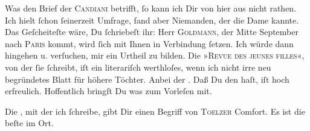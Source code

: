 \pstart
           Was den Brief der \textsc{Candiani} betrifft,{ }ſo kann ich Dir von hier aus nicht rathen. Ich hielt{ }ſchon{ }ſeinerzeit
               Umfrage, fand aber Niemanden, der die Dame
               kannte. Das Geſcheiteſte wäre, Du{ }ſchriebeſt ihr: Herr \textsc{Goldmann}, der Mitte September{ }{\pb}nach \textsc{Paris} kommt, wird{ }ſich mit Ihnen in Verbindung{ }ſetzen. Ich würde dann hingehen u.
               verſuchen, mir \label{K_L02743-3v}\label{K_L02743-3} ein
               Urtheil zu bilden. Die »\textsc{Revue des jeunes filles}«, von der{ }ſie{ }ſchreibt, iſt ein literariſch werthloſes, wenn ich nicht irre neu
               begründetes Blatt\strikeout{\textcolor{gray}{e}} für höhere Töchter. Anbei der \label{K_L02743-4v}\label{K_L02743-4}.
                  {\pb}Daß Du den \label{K_L02743-5v}\label{K_L02743-5} haſt, iſt hoch erfreulich. Hoffentlich bringſt Du was zum Vorleſen mit.\pend
           
\pstart
           Die \label{K_L02743-6v}\label{K_L02743-6}, mit
               der ich{ }ſchreibe, gibt Dir einen Begriff von \textsc{Toelzer} Comfort. Es ist die beſte im
               Ort.\pend
           
